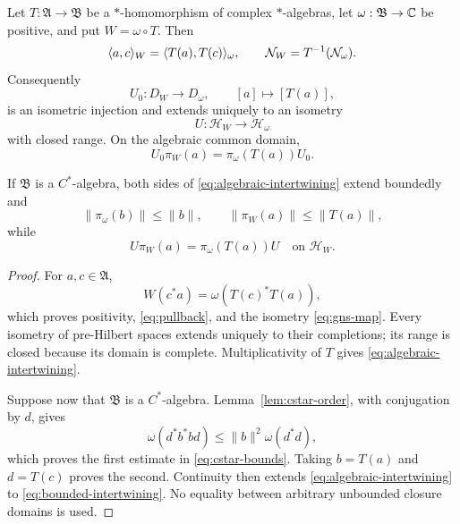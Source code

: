 \begin{theorem}
\label{thm:dagger}
Let $T:\mathfrak A\to\mathfrak B$ be a $*$-homomorphism of complex
$*$-algebras, let $\omega:\mathfrak B\to\mathbb C$ be positive, and put
$W=\omega\circ T$.  Then
\begin{equation}
 \langle a,c\rangle_W
 =\langle T(a),T(c)\rangle_\omega,
 \qquad
 \mathcal N_W=T^{-1}(\mathcal N_\omega).
 \label{eq:pullback}
\end{equation}
Consequently
\begin{equation}
 U_0:D_W\longrightarrow D_\omega,
 \qquad [a]\longmapsto[T(a)],
 \label{eq:gns-map}
\end{equation}
is an isometric injection and extends uniquely to an isometry
\begin{equation}
 U:\mathcal H_W\longrightarrow\mathcal H_\omega
 \label{eq:completion-map}
\end{equation}
with closed range.  On the algebraic common domain,
\begin{equation}
 U_0\pi_W(a)=\pi_\omega(T(a))U_0.
 \label{eq:algebraic-intertwining}
\end{equation}

If $\mathfrak B$ is a $C^*$-algebra, both sides of
\eqref{eq:algebraic-intertwining} extend boundedly and
\begin{equation}
 \|\pi_\omega(b)\|\leq\|b\|,
 \qquad
 \|\pi_W(a)\|\leq\|T(a)\|,
 \label{eq:cstar-bounds}
\end{equation}
while
\begin{equation}
 U\pi_W(a)=\pi_\omega(T(a))U
 \quad\text{on }\mathcal H_W.
 \label{eq:bounded-intertwining}
\end{equation}
\end{theorem}

\begin{proof}
For $a,c\in\mathfrak A$,
\[
 W(c^*a)=\omega(T(c)^*T(a)),
\]
which proves positivity, \eqref{eq:pullback}, and the isometry
\eqref{eq:gns-map}.  Every isometry of pre-Hilbert spaces extends
uniquely to their completions; its range is closed because its domain is
complete.  Multiplicativity of $T$ gives
\eqref{eq:algebraic-intertwining}.

Suppose now that $\mathfrak B$ is a $C^*$-algebra.  Lemma~\ref{lem:cstar-order}, with conjugation by $d$, gives
\[
 \omega(d^*b^*bd)\leq\|b\|^2\omega(d^*d),
\]
which proves the first estimate in \eqref{eq:cstar-bounds}.  Taking
$b=T(a)$ and $d=T(c)$ proves the second.  Continuity then extends
\eqref{eq:algebraic-intertwining} to
\eqref{eq:bounded-intertwining}.  No equality between arbitrary
unbounded closure domains is used.
\end{proof}

